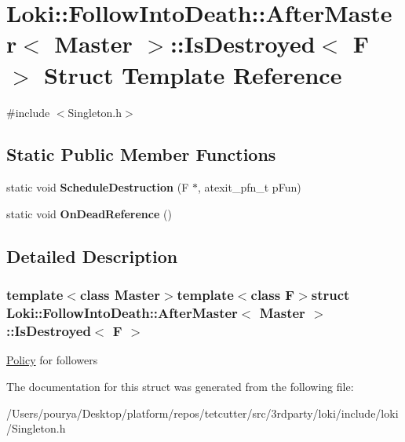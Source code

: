 \hypertarget{structLoki_1_1FollowIntoDeath_1_1AfterMaster_1_1IsDestroyed}{}\section{Loki\+:\+:Follow\+Into\+Death\+:\+:After\+Master$<$ Master $>$\+:\+:Is\+Destroyed$<$ F $>$ Struct Template Reference}
\label{structLoki_1_1FollowIntoDeath_1_1AfterMaster_1_1IsDestroyed}


{\ttfamily \#include $<$Singleton.\+h$>$}

\subsection*{Static Public Member Functions}
\begin{DoxyCompactItemize}
\item 
\hypertarget{structLoki_1_1FollowIntoDeath_1_1AfterMaster_1_1IsDestroyed_a00bdcb0018e0a678018f9e767caf1d31}{}static void {\bfseries Schedule\+Destruction} (F $\ast$, atexit\+\_\+pfn\+\_\+t p\+Fun)\label{structLoki_1_1FollowIntoDeath_1_1AfterMaster_1_1IsDestroyed_a00bdcb0018e0a678018f9e767caf1d31}

\item 
\hypertarget{structLoki_1_1FollowIntoDeath_1_1AfterMaster_1_1IsDestroyed_a9a2d4a4fa70972a93c4f54f4533e1ad7}{}static void {\bfseries On\+Dead\+Reference} ()\label{structLoki_1_1FollowIntoDeath_1_1AfterMaster_1_1IsDestroyed_a9a2d4a4fa70972a93c4f54f4533e1ad7}

\end{DoxyCompactItemize}


\subsection{Detailed Description}
\subsubsection*{template$<$class Master$>$template$<$class F$>$struct Loki\+::\+Follow\+Into\+Death\+::\+After\+Master$<$ Master $>$\+::\+Is\+Destroyed$<$ F $>$}

\hyperlink{structPolicy}{Policy} for followers 

The documentation for this struct was generated from the following file\+:\begin{DoxyCompactItemize}
\item 
/\+Users/pourya/\+Desktop/platform/repos/tetcutter/src/3rdparty/loki/include/loki/Singleton.\+h\end{DoxyCompactItemize}
